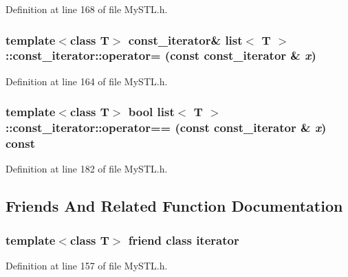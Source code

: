 Definition at line 168 of file MySTL.h.

\subsubsection[{operator=}]{\setlength{\rightskip}{0pt plus 5cm}template$<$class T$>$ {\bf const\_\-iterator}\& {\bf list}$<$ T $>$::const\_\-iterator::operator= (const {\bf const\_\-iterator} \& {\em x})}\label{classlist_1_1const__iterator_ad200a0dd9e9742557a850015ef981474}


Definition at line 164 of file MySTL.h.

\subsubsection[{operator==}]{\setlength{\rightskip}{0pt plus 5cm}template$<$class T$>$ bool {\bf list}$<$ T $>$::const\_\-iterator::operator== (const {\bf const\_\-iterator} \& {\em x}) const}\label{classlist_1_1const__iterator_a6d92272cc5993306633b1bb74dd7f348}


Definition at line 182 of file MySTL.h.



\subsection{Friends And Related Function Documentation}
\subsubsection[{iterator}]{\setlength{\rightskip}{0pt plus 5cm}template$<$class T$>$ friend class {\bf iterator}}\label{classlist_1_1const__iterator_a67171474c4da6cc8efe0c7fafefd2b2d}


Definition at line 157 of file MySTL.h.

